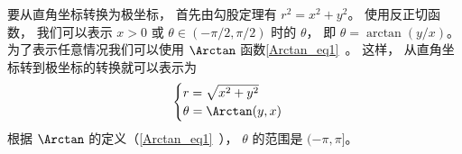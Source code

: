 要从直角坐标转换为极坐标， 首先由勾股定理有 $r^2 = x^2 + y^2$。 使用反正切函数， 我们可以表示 $x >0$ 或 $\theta\in(-\pi/2,\pi/2)$ 时的 $\theta$， 即 $\theta = \arctan(y/x)$。 为了表示任意情况我们可以使用 $\Arctan$ 函数\autoref{Arctan_eq1}~。 这样， 从直角坐标转到极坐标的转换就可以表示为
\begin{equation}\label{Polar_eq4}
\begin{cases}
r = \sqrt{x^2 + y^2}\\
\theta = \Arctan(y, x)
\end{cases}
\end{equation}
根据 $\Arctan$ 的定义（\autoref{Arctan_eq1}~）， $\theta$ 的范围是 $(-\pi, \pi]$。
